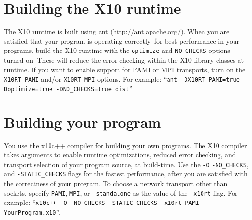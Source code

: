 \section{Building the X10 runtime}
The X10 runtime is built using ant (http://ant.apache.org/).  When you
are satisfied that your program is operating correctly, for best performance in
your programs, build the X10 runtime with the {\tt optimize} and
{\tt NO\_CHECKS} options turned on.  These will reduce the error checking within
the X10 library classes at runtime.  If you want to enable support for PAMI or
MPI transports, turn on the {\tt X10RT\_PAMI} and/or {\tt X10RT\_MPI} options. 
For example: ``{\tt ant -DX10RT\_PAMI=true -Doptimize=true -DNO\_CHECKS=true
dist}''

\section{Building your program}
You use the x10c++ compiler for building your own programs.  The X10 compiler
takes arguments to enable runtime optimizations, reduced error checking, and
transport selection of your program source, at build-time.  Use the {\tt -O}
{\tt -NO\_CHECKS}, and {\tt -STATIC\_CHECKS} flags for the fastest performance,
after you are satisfied with the correctness of your program.  To choose a
network transport other than sockets, specify {\tt PAMI}, {\tt MPI}, or {\tt
standalone} as the value of the {\tt -x10rt} flag.  For example: 
``{\tt x10c++ -O -NO\_CHECKS -STATIC\_CHECKS -x10rt PAMI YourProgram.x10}''.

